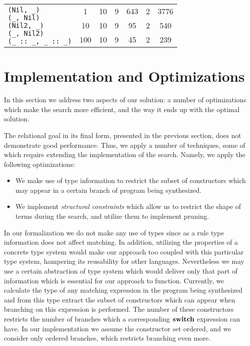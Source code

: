 \begin{table}[t]
\begin{tabular}{|m{3cm}|cc||cccc|}
        \hline
        \multirow{3}{*}{
          \parbox{3cm}{
            \vskip2mm
\lstinline[basicstyle=\scriptsize]|(Nil, _)|\\[-1mm]
\lstinline[basicstyle=\scriptsize]|(_, Nil)|\\[-1mm]
\lstinline[basicstyle=\scriptsize]|(Nil2, _)|\\[-1mm]
\lstinline[basicstyle=\scriptsize]|(_, Nil2)|\\[-1mm]
\lstinline[basicstyle=\scriptsize]|(_ :: _, _ :: _)|}}
         & 1&10&9&643&2&3776\\[3mm]
        \cline{2-7}
      &10&10&9&95&2&540\\[3mm]
        \cline{2-7}
     &100&10&9&45&2&239                    \\ \hline
  \end{tabular}

\end{table}


\section{Implementation and Optimizations}
\label{sec:optimization}

In this section we address two aspects of our solution: a number of optimizations which make the search more efficient, and
the way it ends up with the optimal solution.

The relational goal in its final form, presented in the previous section, does not demonstrate good performance. Thus, we apply a number
of techniques, some of which require extending the implementation of the search. Namely, we apply the following optimizations:

\begin{itemize}
\item We make use of type information to restrict the subset of constructors which may appear in a certain branch of
  program being synthesized.
\item We implement \emph{structural constraints} which allow us to restrict the shape of terms during the search, and
  utilize them to implement pruning.  
\end{itemize}

In our formalization we do not make any use of types since as a rule type information does not affect matching. In addition,
utilizing the properties of a concrete type system would make our approach too coupled with this particular type system, hampering
its reusability for other languages. Nevertheless we may use a certain abstraction of type system which would deliver only
that part of information which is essential for our approach to function. Currently, we calculate the type of any matching expression in
the program being synthesized and from this type extract the subset of constructors which can appear when branching on this expression
is performed. The number of these constructors restricts the number of branches which a corresponding $\mathbf{switch}$ expression can have.
In our implementation we assume the constructor set ordered, and we consider only ordered branches, which restricts branching even more.

